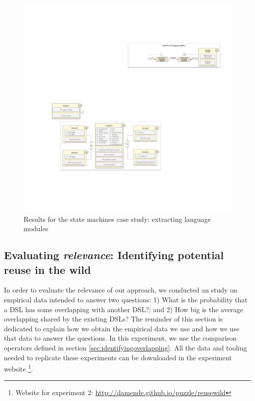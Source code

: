 \begin{figure}[h!]
\centering
\includegraphics[width=1\linewidth]{images/puzzle-modularization.pdf}
\caption{Results for the state machines case study: extracting language modules}
\label{fig:puzzle-modularization}
\end{figure}

\subsection{Evaluating \textit{relevance}: Identifying potential reuse in the wild}

In order to evaluate the relevance of our approach, we conducted an study on empirical data intended to answer two questions: 1) What is the probability that a DSL has some overlapping with another DSL?; and 2) How big is the average overlapping shared by the existing DSLs? The reminder of this section is dedicated to explain how we obtain the empirical data we use and how we use that data to answer the questions. In this experiment, we use the comparison operators defined in section \ref{sec:identifyingoverlapping}. All the data and tooling needed to replicate these experiments can be downloaded in the experiment website \footnote{Website for experiment 2: \url{http://damende.github.io/puzzle/reusewild}}.

